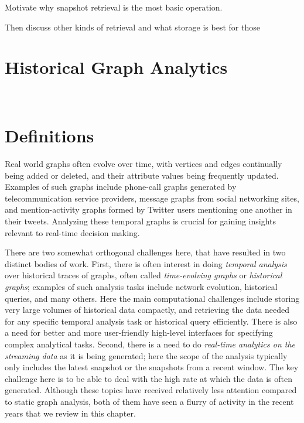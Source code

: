 \documentclass{svjour3}
\begin{document}
Motivate why snapshot retrieval is the most basic operation. 

Then discuss other kinds of retrieval and what storage is best for those

\section{Historical Graph Analytics}


~\cite{khurana2013efficient}~\cite{macko2015llama}~\cite{han2014chronos}~\cite{khurana2016storing}

\section{Definitions}
Real world graphs often evolve over time, with vertices and edges continually being added or deleted, and their attribute values being frequently updated. Examples of such graphs include phone-call graphs generated by telecommunication service providers, message graphs from social networking sites, and mention-activity graphs formed by Twitter users mentioning one another in their tweets. Analyzing these temporal graphs is crucial for gaining insights relevant to real-time decision making.

There are two somewhat orthogonal challenges here, that have resulted in two distinct bodies of work. First, there is often interest in doing {\em temporal analysis} over historical traces of graphs, often called {\em time-evolving graphs} or {\em historical graphs}; examples of such analysis tasks include network evolution, historical queries, and many others. Here the main computational challenges include storing very large volumes of historical data compactly, and retrieving the data needed for any specific temporal analysis task or historical query efficiently. There is also a need for better and more user-friendly high-level interfaces for specifying complex analytical tasks.
Second, there is a need to do {\em real-time analytics on the streaming data} as it is being generated; here the scope of the analysis typically only includes the latest snapshot or the snapshots from a recent window. The key challenge here is to be able to deal with the high rate at which the data is often generated. Although these topics have received relatively less attention compared to static graph analysis,
both of them have seen a flurry of activity in the recent years that we review in this chapter.
\end{document}
